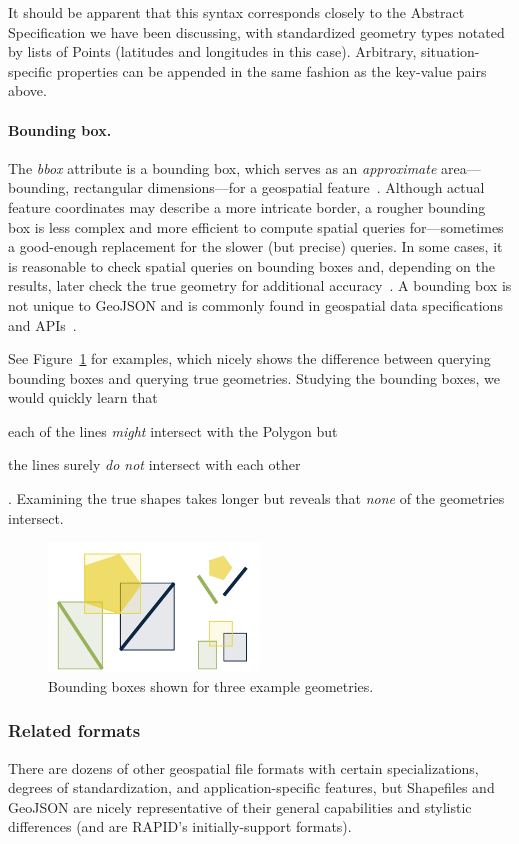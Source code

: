 It should be apparent that this syntax corresponds closely to the Abstract Specification we have been discussing, with standardized geometry types notated by lists of Points (latitudes and longitudes in this case). Arbitrary, situation-specific properties can be appended in the same fashion as the key-value pairs above.

\paragraph{Bounding box.}
The \textit{bbox} attribute is a bounding box, which serves as an \textit{approximate} area---bounding, rectangular dimensions---for a geospatial feature~\cite{Boundless}. Although actual feature coordinates may describe a more intricate border, a rougher bounding box is less complex and more efficient to compute spatial queries for---sometimes a good-enough replacement for the slower (but precise) queries. In some cases, it is reasonable to check spatial queries on bounding boxes and, depending on the results, later check the true geometry for additional accuracy~\cite{Boundless}. A bounding box is not unique to GeoJSON and is commonly found in geospatial data specifications and APIs~\cite{Boundless}. 

See Figure~\ref{fig:bbox} for examples, which nicely shows the difference between querying bounding boxes and querying true geometries. Studying the bounding boxes, we would quickly learn that \begin{enumerate*}[label=\itshape\alph*\upshape)]
\item each of the lines \textit{might} intersect with the Polygon but
\item the lines surely \textit{do not} intersect with each other
\end{enumerate*}. Examining the true shapes takes longer but reveals that \textit{none} of the geometries intersect.

\begin{figure}
    \centering
    \includegraphics[width=0.5\textwidth]{figures/bbox.png}
    \caption{Bounding boxes shown for three example geometries.}
    \label{fig:bbox}
\end{figure}

\subsubsection{Related formats}
There are dozens of other geospatial file formats with certain specializations, degrees of standardization, and application-specific features, but Shapefiles and GeoJSON are nicely representative of their general capabilities and stylistic differences (and are RAPID's initially-support formats).
